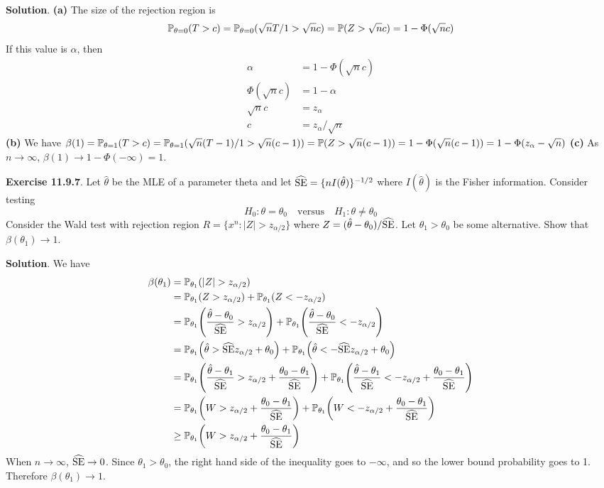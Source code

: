 \textbf{Solution}.
\textbf{(a)} The size of the rejection region is
\[
\operatorname{\mathbb{P}}_{\theta = 0}(T > c) = \operatorname{\mathbb{P}}_{\theta = 0}(\sqrt{n}T / 1 > \sqrt{n}c) = \operatorname{\mathbb{P}}(Z > \sqrt{n} c) = 1 - \Phi(\sqrt{n}c)
\]
If this value is \(\alpha\), then
\begin{align*}
\alpha &= 1 - \Phi(\sqrt{n}c) \\
\Phi(\sqrt{n}c) &= 1 - \alpha \\
\sqrt{n}c &= z_{\alpha} \\
c &= z_{\alpha} / \sqrt{n}
\end{align*}
\textbf{(b)} We have
\(\beta(1) = \operatorname{\mathbb{P}}_{\theta = 1}(T > c) = \operatorname{\mathbb{P}}_{\theta = 1}(\sqrt{n}(T - 1)/1 > \sqrt{n}(c - 1)) = \operatorname{\mathbb{P}}(Z > \sqrt{n}(c - 1)) = 1 - \Phi(\sqrt{n}(c - 1)) = 1 - \Phi(z_\alpha - \sqrt{n})\)
\textbf{(c)} As \(n \rightarrow \infty\),
\(\beta(1) \rightarrow 1 - \Phi(-\infty) = 1\).

\textbf{Exercise 11.9.7}. Let \(\hat{\theta}\) be the MLE of a parameter
theta and let \(\widehat{\operatorname{\mathrm{SE}}} = \{ n I(\hat{\theta})\}^{-1/2}\) where
\(I(\hat{\theta})\) is the Fisher information. Consider testing
\[
H_{0}: \theta = \theta_{0} \quad \text{versus} \quad H_{1}: \theta \neq \theta_{0}
\]
Consider the Wald test with rejection region
\(R = \{ x^{n}: |Z| > z_{\alpha/2} \}\) where
\(Z = (\hat{\theta} - \theta_{0}) / \widehat{\operatorname{\mathrm{SE}}}\). Let
\(\theta_{1} > \theta_{0}\) be some alternative. Show that
\(\beta(\theta_{1}) \rightarrow 1\).

\textbf{Solution}.
We have
\begin{align*}
\beta(\theta_{1}) &= \PROB_{\theta_{1}}(|Z| > z_{\alpha/2}) \\
&= \PROB_{\theta_{1}}(Z > z_{\alpha/2}) + \PROB_{\theta_{1}}(Z < - z_{\alpha/2})\\
&= \PROB_{\theta_{1}}\left(\frac{\hat{\theta} - \theta_{0}}{\widehat{\SE}} > z_{\alpha/2}\right)
+ \PROB_{\theta_{1}}\left(\frac{\hat{\theta} - \theta_{0}}{\widehat{\SE}} < -z_{\alpha/2}\right) \\
&= \PROB_{\theta_{1}}\left(\hat{\theta} > \widehat{\SE} z_{\alpha/2} + \theta_{0} \right)
+ \PROB_{\theta_{1}}\left(\hat{\theta} < -\widehat{\SE} z_{\alpha/2} + \theta_{0} \right) \\
&= \PROB_{\theta_{1}}\left(\frac{\hat{\theta} - \theta_{1}}{\widehat{\SE}} >  z_{\alpha/2} + \frac{\theta_{0} - \theta_{1}}{\widehat{\SE}} \right)
+ \PROB_{\theta_{1}}\left(\frac{\hat{\theta} - \theta_{1}}{\widehat{\SE}} <  -z_{\alpha/2} + \frac{\theta_{0} - \theta_{1}}{\widehat{\SE}} \right) \\
&= \PROB_{\theta_{1}}\left(W >  z_{\alpha/2} + \frac{\theta_{0} - \theta_{1}}{\widehat{\SE}} \right)
+ \PROB_{\theta_{1}}\left(W <  -z_{\alpha/2} + \frac{\theta_{0} - \theta_{1}}{\widehat{\SE}} \right) \\
& \geq \PROB_{\theta_{1}}\left(W >  z_{\alpha/2} + \frac{\theta_{0} - \theta_{1}}{\widehat{\SE}} \right)
\end{align*}
When \(n \rightarrow \infty\), \(\widehat{\operatorname{\mathrm{SE}}} \rightarrow 0\). Since
\(\theta_{1} > \theta_{0}\), the right hand side of the inequality goes to
\(-\infty\), and so the lower bound probability goes to 1. Therefore
\(\beta(\theta_{1}) \rightarrow 1\).

